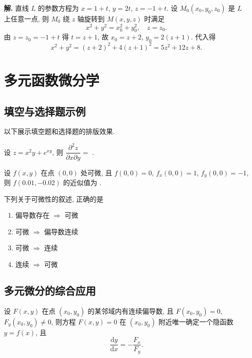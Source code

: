 \documentclass[a4paper,12pt,oneside]{maki-notes}
\begin{document}
	\textbf{解.} 直线 $L$ 的参数方程为 $x = 1 + t$, $y = 2t$, $z = -1 + t$. 设 $M_0(x_0, y_0, z_0)$ 是 $L$ 上任意一点, 则 $M_0$ 绕 $z$ 轴旋转到 $M(x, y, z)$ 时满足
	\[
	x^2 + y^2 = x_0^2 + y_0^2, \quad z = z_0.
	\]
	由 $z = z_0 = -1 + t$ 得 $t = z + 1$, 故 $x_0 = z + 2$, $y_0 = 2(z+1)$. 代入得
	\[
	x^2 + y^2 = (z+2)^2 + 4(z+1)^2 = 5z^2 + 12z + 8.
	\]
	
	\chapter{多元函数微分学}
	
	\section{填空与选择题示例}
	
	以下展示填空题和选择题的排版效果.
	
	\begin{exercise}
		设 $z = x^2y + e^{xy}$, 则 $\dfrac{\partial^2 z}{\partial x \partial y} = $ \fillin[4cm].
	\end{exercise}
	
	\begin{exercise}
		设 $f(x,y)$ 在点 $(0,0)$ 处可微, 且 $f(0,0) = 0$, $f_x(0,0) = 1$, $f_y(0,0) = -1$, 则 $f(0.01, -0.02)$ 的近似值为 \fillin.
	\end{exercise}
	
	\begin{exercise}
		下列关于可微性的叙述, 正确的是\selectbracket
		\begin{enumerate}
			\item[A.] 偏导数存在 $\Longrightarrow$ 可微
			\item[B.] 可微 $\Longrightarrow$ 偏导数连续
			\item[C.] 可微 $\Longrightarrow$ 连续
			\item[D.] 连续 $\Longrightarrow$ 可微
		\end{enumerate}
	\end{exercise}
	
	\section{多元微分的综合应用}
	
	\begin{theorem}[隐函数存在定理]
		设 $F(x, y)$ 在点 $(x_0, y_0)$ 的某邻域内有连续偏导数, 且 $F(x_0, y_0) = 0$, $F_y(x_0, y_0) \neq 0$, 则方程 $F(x,y) = 0$ 在 $(x_0, y_0)$ 附近唯一确定一个隐函数 $y = f(x)$, 且
		\[
		\dfrac{\mathrm{d}y}{\mathrm{d}x} = -\dfrac{F_x}{F_y}.
		\]
	\end{theorem}
	
\end{document}
